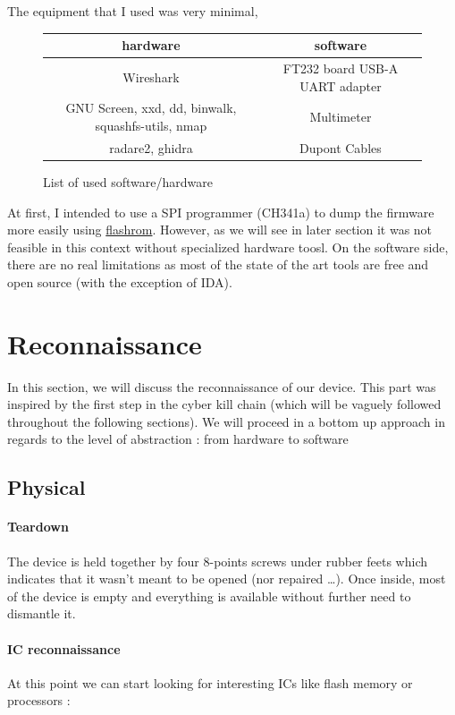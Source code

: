 \documentclass{article}
\begin{document}
\noindent The equipment that I used was very minimal,

\begin{figure}[!ht]
\begin{tabular}{|c|c|}
	\hline
	hardware & software \\
	\hline
	Wireshark & FT232 board USB-A UART adapter \\
	GNU Screen, xxd, dd, binwalk, squashfs-utils, nmap & Multimeter \\
	radare2, ghidra & Dupont Cables\\
	\hline
\end{tabular}
\caption{List of used software/hardware}
\end{figure}


At first, I intended to use a SPI programmer (CH341a) to dump the firmware more easily using \href{https://github.com/flashrom/flashrom}{flashrom}. However, as we will see in later section it was not feasible in this context without specialized hardware toosl. On the software side, there are no real limitations as most of the state of the art tools are free and open source (with the exception of IDA).
\section{Reconnaissance}
In this section, we will discuss the reconnaissance of our device. This part was inspired by the first step in the cyber kill chain (which will be vaguely followed throughout the following sections). We will proceed in a bottom up approach in regards to the level of abstraction : from hardware to software
\newpage
\subsection{Physical}
\paragraph{Teardown} The device is held together by four 8-points screws under rubber feets which indicates that it wasn't meant to be opened (nor repaired \dots). Once inside, most of the device is empty and everything is available without further need to dismantle it. 

\paragraph{IC reconnaissance} At this point we can start looking for interesting ICs like flash memory or processors :
\end{document}
